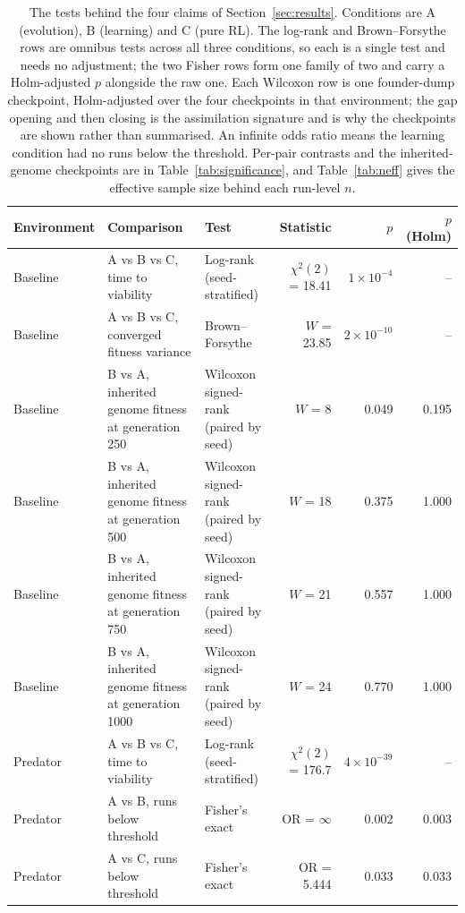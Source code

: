 \begin{table}[t]
  \centering
  \caption{The tests behind the four claims of Section~\ref{sec:results}.
  Conditions are A (evolution), B (learning) and C (pure RL). The log-rank and
  Brown--Forsythe rows are omnibus tests across all three conditions, so each is
  a single test and needs no adjustment; the two Fisher rows form one family of
  two and carry a Holm-adjusted $p$ alongside the raw one. Each Wilcoxon row
  is one founder-dump checkpoint, Holm-adjusted over the four checkpoints in
  that environment; the gap opening and then closing is the assimilation
  signature and is why the checkpoints are shown rather than summarised. An
  infinite odds
  ratio means the learning condition had no runs below the threshold. Per-pair
  contrasts and the inherited-genome checkpoints are in
  Table~\ref{tab:significance}, and Table~\ref{tab:neff} gives the effective
  sample size behind each run-level $n$.}
  \label{tab:headline}
  \small
  \setlength{\tabcolsep}{5pt}
  \begin{tabular}{@{}lllrrr@{}}
    \toprule
    Environment & Comparison & Test & Statistic & $p$ & $p$ (Holm) \\
    \midrule
    Baseline & A vs B vs C, time to viability & Log-rank (seed-stratified) & $\chi^2(2)$ = 18.41 & $1{\times}10^{-4}$ & -- \\
    Baseline & A vs B vs C, converged fitness variance & Brown--Forsythe & $W$ = 23.85 & $2{\times}10^{-10}$ & -- \\
    Baseline & B vs A, inherited genome fitness at generation 250 & Wilcoxon signed-rank (paired by seed) & $W$ = 8 & 0.049 & 0.195 \\
    Baseline & B vs A, inherited genome fitness at generation 500 & Wilcoxon signed-rank (paired by seed) & $W$ = 18 & 0.375 & 1.000 \\
    Baseline & B vs A, inherited genome fitness at generation 750 & Wilcoxon signed-rank (paired by seed) & $W$ = 21 & 0.557 & 1.000 \\
    Baseline & B vs A, inherited genome fitness at generation 1000 & Wilcoxon signed-rank (paired by seed) & $W$ = 24 & 0.770 & 1.000 \\
    Predator & A vs B vs C, time to viability & Log-rank (seed-stratified) & $\chi^2(2)$ = 176.7 & $4{\times}10^{-39}$ & -- \\
    Predator & A vs B, runs below threshold & Fisher's exact & OR = $\infty$ & 0.002 & 0.003 \\
    Predator & A vs C, runs below threshold & Fisher's exact & OR = 5.444 & 0.033 & 0.033 \\

\end{tabular}
\end{table}
